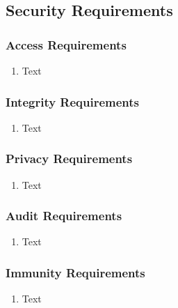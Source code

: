 \documentclass [11pt]{article}
\begin{document}
\subsection{Security Requirements }

\subsubsection{Access Requirements }
	\begin{enumerate}[label=\textbf{(\roman*)}]
		\item Text
	\end{enumerate}

\subsubsection{Integrity Requirements }
	\begin{enumerate}[label=\textbf{(\roman*)}]
		\item Text
	\end{enumerate}

\subsubsection{Privacy Requirements }
	\begin{enumerate}[label=\textbf{(\roman*)}]
		\item Text
	\end{enumerate}

\subsubsection{Audit  Requirements }
	\begin{enumerate}[label=\textbf{(\roman*)}]
		\item Text
	\end{enumerate} 

\subsubsection{Immunity Requirements  }
	\begin{enumerate}[label=\textbf{(\roman*)}]
		\item Text
	\end{enumerate}
\end{document}
